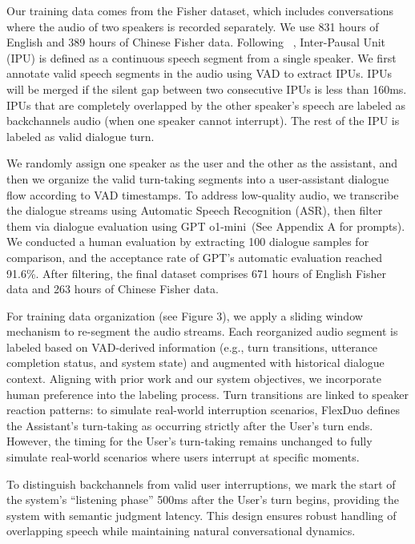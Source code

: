 \documentclass[11pt]{article}
\begin{document}
Our training data comes from the Fisher dataset, which includes conversations where the audio of two speakers is recorded separately. We use 831 hours of English and 389 hours of Chinese Fisher data. Following ~\cite{skantze2021turn}, Inter-Pausal Unit (IPU) is defined as a continuous speech segment from a single speaker. We first annotate valid speech segments in the audio using VAD to extract IPUs.  IPUs will be merged if the silent gap between two consecutive IPUs is less than 160ms. IPUs that are completely overlapped by the other speaker’s speech are labeled as backchannels audio (when one speaker cannot interrupt). The rest of the IPU is labeled as valid dialogue turn.

We randomly assign one speaker as the user and the other as the assistant, and then we organize the valid turn-taking segments into a user-assistant dialogue flow according to VAD timestamps. To address low-quality audio, we transcribe the dialogue streams using Automatic Speech Recognition (ASR), then filter them via dialogue evaluation using GPT o1-mini~\cite{openai2024o1mini}(See Appendix A for prompts). We conducted a human evaluation by extracting 100 dialogue samples for comparison, and the acceptance rate of GPT's automatic evaluation reached 91.6\%. After filtering, the final dataset comprises 671 hours of English Fisher data and 263 hours of Chinese Fisher data.

For training data organization (see Figure 3), we apply a sliding window mechanism to re-segment the audio streams. Each reorganized audio segment is labeled based on VAD-derived information (e.g., turn transitions, utterance completion status, and system state) and augmented with historical dialogue context. Aligning with prior work and our system objectives, we incorporate human preference into the labeling process. Turn transitions are linked to speaker reaction patterns: to simulate real-world interruption scenarios, FlexDuo defines the Assistant’s turn-taking as occurring strictly after the User’s turn ends. However, the timing for the User’s turn-taking remains unchanged to fully simulate real-world scenarios where users interrupt at specific moments.

To distinguish backchannels from valid user interruptions, we mark the start of the system’s ``listening phase'' 500ms after the User’s turn begins, providing the system with semantic judgment latency. This design ensures robust handling of overlapping speech while maintaining natural conversational dynamics.
\end{document}
